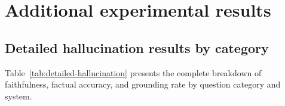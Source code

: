 \documentclass[review]{elsarticle}
\begin{document}
\section{Additional experimental results}
\label{app:results}

\subsection{Detailed hallucination results by category}

Table~\ref{tab:detailed-hallucination} presents the complete breakdown of faithfulness, factual accuracy, and grounding rate by question category and system.
\end{document}
